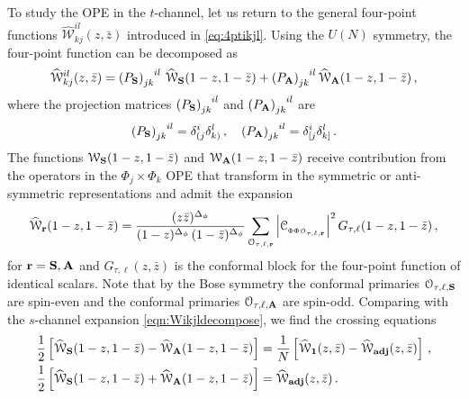\documentclass[11pt]{article}
\newcommand{\zb}{\bar{z}}
\newcommand{\cope}[1]{\mathcal{C}_{_{#1}}}
\begin{document}
To study the OPE in the $t$-channel, let us return to the general four-point functions $\widehat{\mathcal{W}}^{il}_{kj}(z,\zb)$ introduced in \eqref{eq:4ptikjl}. Using the $U(N)$ symmetry, the four-point function can be decomposed as
%
\begin{equation}\label{eqn:general4ptT}
\widehat{\mathcal{W}}^{il}_{kj}(z,\zb)  = \tensor{\left(P_{\bf S}\right)}{_{jk}^{il}}\,  \widehat{\mathcal{W}}_{\bf S}(1-z,1-\zb)+ \tensor{\left(P_{\bf A}\right)}{_{jk}^{il}} \widehat{\mathcal{W}}_{\bf A}(1-z,1-\zb)\,,
\end{equation}
%
where the projection matrices $\tensor{\left(P_{\bf S}\right)}{_{jk}^{il}}$ and $\tensor{\left(P_{\bf A}\right)}{_{jk}^{il}}$ are
%
\begin{equation}
\tensor{\left(P_{\bf S}\right)}{_{jk}^{il}}=\delta_{(j}^i\delta_{k)}^l\,, \quad  \tensor{\left(P_{\bf A}\right)}{_{jk}^{il}} =\delta_{[j}^i\delta_{k]}^l\,.
\end{equation}
%
The functions $\mathcal{W}_{\bf S}(1-z,1-\zb)$ and $\mathcal{W}_{\bf A}(1-z,1-\zb)$ receive contribution from the operators in the $\Phi_j \times \Phi_k$ OPE that transform in the symmetric or anti-symmetric representations and admit the expansion
%
\begin{equation}
\widehat{\mathcal{W}}_{\bf r}(1-z,1- \zb)=  \frac{(z\zb)^{\Delta_{\phi}}}{(1-z)^{\Delta_\phi}\, (1-\zb)^{\Delta_\phi}}\sum_{\mathcal{O}_{\tau,\ell,{\bf r}}}\left|\cope{\Phi\Phi\mathcal{O}_{\tau,\ell,{\bf r}}}\right|^2 G_{\tau,\ell}(1-z,1-\zb)\,,
\end{equation}
%
for ${\bf r}={\bf S},{\bf A}$ and $G_{\tau,\ell}(z,\zb)$ is the conformal block for the four-point function of identical scalars. Note that by the Bose symmetry the conformal primaries $\mathcal{O}_{\tau,\ell,{\bf S}}$ are spin-even and the conformal primaries $\mathcal{O}_{\tau,\ell,{\bf A}}$ are spin-odd. Comparing with the $s$-channel expansion \eqref{eqn:Wikjldecompose}, we find the crossing equations
%
\begin{equation}
\begin{split}
\frac{1}{2}\left[\widehat{\mathcal W}_{\bf S}(1-z,1-\zb)-\widehat{\mathcal W}_{\bf A}(1-z,1-\zb)\right]&= \frac{1}{N}  \left[\widehat{\mathcal W}_{\bf 1}(z,\zb)-\widehat{\mathcal W}_{\bf adj}(z,\zb)\right]\,,
\\
\frac{1}{2}\left[\widehat{\mathcal W}_{\bf S}(1-z,1-\zb)+\widehat{\mathcal W}_{\bf A}(1-z,1-\zb)\right]&=\widehat{\mathcal W}_{\bf adj}(z,\zb)\,.
\end{split}
\end{equation}
\end{document}
